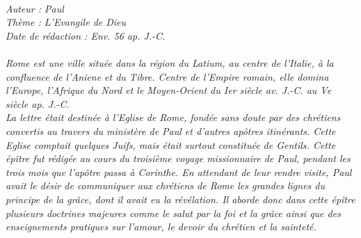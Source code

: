 \BFont
\noindent\hrulefill
{\footnotesize
\textit{
\bigskip
{\centering{}
\\Auteur : Paul
\\Thème : L'Evangile de Dieu
\\Date de rédaction : Env. 56 ap. J.-C.\\}
}
\textit{
\\Rome est une ville située dans la région du Latium, au centre de l’Italie, à la confluence de l’Aniene et du Tibre. Centre de l’Empire romain, elle domina l’Europe, l’Afrique du Nord et le Moyen-Orient du Ier siècle av. J.-C. au Ve siècle ap. J.-C.
\\La lettre était destinée à l’Eglise de Rome, fondée sans doute par des chrétiens convertis au travers du ministère de Paul et d’autres apôtres itinérants. Cette Eglise comptait quelques Juifs, mais était surtout constituée de Gentils. Cette
épître fut rédigée au cours du troisième voyage missionnaire de Paul, pendant les trois mois que l’apôtre passa à Corinthe.
En attendant de leur rendre visite, Paul avait le désir de communiquer aux chrétiens de Rome les grandes lignes du principe de la grâce, dont il avait eu la révélation. Il aborde donc dans cette épître plusieurs doctrines majeures comme le salut par la foi et la grâce ainsi que des enseignements pratiques sur l’amour, le devoir du chrétien et la sainteté.\bigskip
}
}
\par\nobreak\noindent\hrulefill
